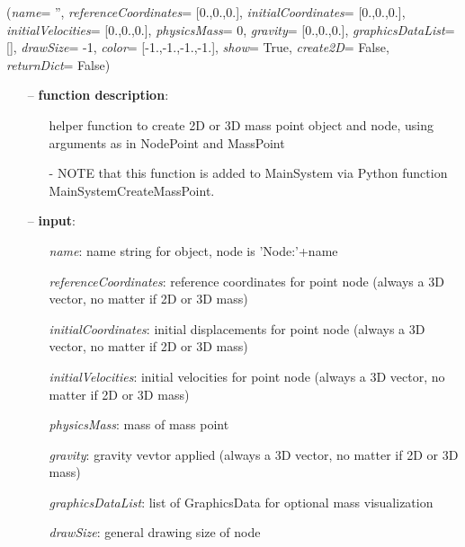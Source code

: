 \ei

%
\begin{flushleft}
\label{sec:mainsystemextensions:CreateMassPoint}
({\it name}= '', {\it referenceCoordinates}= [0.,0.,0.], {\it initialCoordinates}= [0.,0.,0.], {\it initialVelocities}= [0.,0.,0.], {\it physicsMass}= 0, {\it gravity}= [0.,0.,0.], {\it graphicsDataList}= [], {\it drawSize}= -1, {\it color}= [-1.,-1.,-1.,-1.], {\it show}= True, {\it create2D}= False, {\it returnDict}= False)
\end{flushleft}
\setlength{\itemindent}{0.7cm}
\begin{itemize}[leftmargin=0.7cm]
\item[--]
{\bf function description}: \vspace{-6pt}
\begin{itemize}[leftmargin=1.2cm]
\setlength{\itemindent}{-0.7cm}
\item[]helper function to create 2D or 3D mass point object and node, using arguments as in NodePoint and MassPoint
\item[]- NOTE that this function is added to MainSystem via Python function MainSystemCreateMassPoint.
\end{itemize}
\item[--]
{\bf input}: \vspace{-6pt}
\begin{itemize}[leftmargin=1.2cm]
\setlength{\itemindent}{-0.7cm}
\item[]{\it name}: name string for object, node is 'Node:'+name
\item[]{\it referenceCoordinates}: reference coordinates for point node (always a 3D vector, no matter if 2D or 3D mass)
\item[]{\it initialCoordinates}: initial displacements for point node (always a 3D vector, no matter if 2D or 3D mass)
\item[]{\it initialVelocities}: initial velocities for point node (always a 3D vector, no matter if 2D or 3D mass)
\item[]{\it physicsMass}: mass of mass point
\item[]{\it gravity}: gravity vevtor applied (always a 3D vector, no matter if 2D or 3D mass)
\item[]{\it graphicsDataList}: list of GraphicsData for optional mass visualization
\item[]{\it drawSize}: general drawing size of node

\end{itemize}
\end{itemize}
